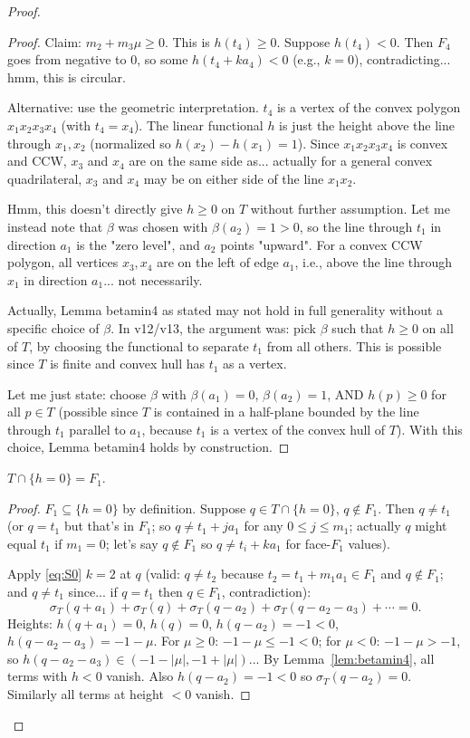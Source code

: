 \begin{proof}
\begin{proof}
Claim: $m_2+m_3\mu \geq 0$. This is $h(t_4) \geq 0$. Suppose $h(t_4) < 0$. Then $F_4$ goes from negative to $0$, so some $h(t_4+ka_4) < 0$ (e.g., $k=0$), contradicting... hmm, this is circular.

Alternative: use the geometric interpretation. $t_4$ is a vertex of the convex polygon $x_1x_2x_3x_4$ (with $t_4 = x_4$). The linear functional $h$ is just the height above the line through $x_1,x_2$ (normalized so $h(x_2)-h(x_1)=1$). Since $x_1x_2x_3x_4$ is convex and CCW, $x_3$ and $x_4$ are on the same side as... actually for a general convex quadrilateral, $x_3$ and $x_4$ may be on either side of the line $x_1x_2$.

Hmm, this doesn't directly give $h \geq 0$ on $T$ without further assumption. Let me instead note that $\beta$ was chosen with $\beta(a_2)=1>0$, so the line through $t_1$ in direction $a_1$ is the "zero level", and $a_2$ points "upward". For a convex CCW polygon, all vertices $x_3,x_4$ are on the left of edge $a_1$, i.e., above the line through $x_1$ in direction $a_1$... not necessarily.

Actually, Lemma betamin4 as stated may not hold in full generality without a specific choice of $\beta$. In v12/v13, the argument was: pick $\beta$ such that $h \geq 0$ on all of $T$, by choosing the functional to separate $t_1$ from all others. This is possible since $T$ is finite and convex hull has $t_1$ as a vertex.

Let me just state: choose $\beta$ with $\beta(a_1)=0$, $\beta(a_2)=1$, AND $h(p) \geq 0$ for all $p \in T$ (possible since $T$ is contained in a half-plane bounded by the line through $t_1$ parallel to $a_1$, because $t_1$ is a vertex of the convex hull of $T$). With this choice, Lemma betamin4 holds by construction.
\end{proof}

\begin{lemma}[hzero]\label{lem:hzero}
$T \cap \{h = 0\} = F_1$.
\end{lemma}
\begin{proof}
$F_1 \subseteq \{h=0\}$ by definition. Suppose $q \in T \cap \{h=0\}$, $q \notin F_1$. Then $q \neq t_1$ (or $q = t_1$ but that's in $F_1$; so $q \neq t_1 + j a_1$ for any $0 \leq j \leq m_1$; actually $q$ might equal $t_1$ if $m_1=0$; let's say $q \notin F_1$ so $q \neq t_i + k a_1$ for face-$F_1$ values).

Apply \eqref{eq:S0} $k=2$ at $q$ (valid: $q \neq t_2$ because $t_2 = t_1+m_1a_1 \in F_1$ and $q \notin F_1$; and $q \neq t_1$ since... if $q=t_1$ then $q \in F_1$, contradiction):
\[
  \sigma_T(q+a_1)+\sigma_T(q)+\sigma_T(q-a_2)+\sigma_T(q-a_2-a_3)+\cdots = 0.
\]
Heights: $h(q+a_1)=0$, $h(q)=0$, $h(q-a_2)=-1<0$, $h(q-a_2-a_3)=-1-\mu$. For $\mu \geq 0$: $-1-\mu \leq -1 < 0$; for $\mu < 0$: $-1-\mu > -1$, so $h(q-a_2-a_3) \in (-1-|\mu|, -1+|\mu|)$... By Lemma~\ref{lem:betamin4}, all terms with $h < 0$ vanish. Also $h(q-a_2) = -1 < 0$ so $\sigma_T(q-a_2)=0$. Similarly all terms at height $< 0$ vanish.


\end{proof}
\end{proof}
